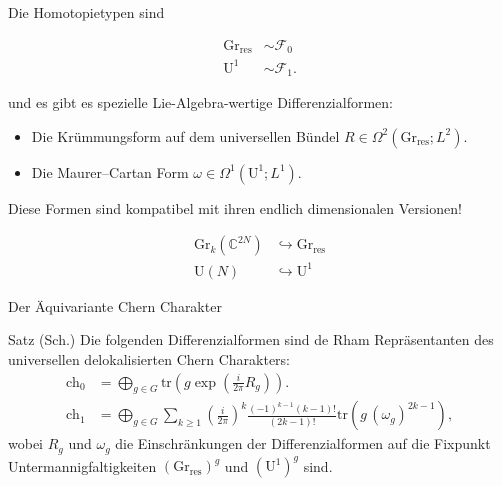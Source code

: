 \documentclass[12pt,utf8,notheorems,compress,t]{beamer}
\renewcommand{\_}{\mathpunct{.}}
\newcommand{\?}{\,{:}\,}
\newcommand{\CC}{\mathbb{C}}
\newcommand{\tr}{\mathrm{tr}}
\newcommand{\ch}{\mathrm{ch}}
\newcommand{\grres}{\mathrm{Gr}_{\mathrm{res}}}
\begin{document}
\begin{frame}
    Die Homotopietypen sind 
    \begin{exampleblock}{}
        \vspace{-1em}
        \begin{align*}
            \mathrm{Gr}_{\mathrm{res}} &\sim \mathscr{F}_0 \\
            \mathrm U^1 &\sim \mathscr{F}_1.
        \end{align*}
    \end{exampleblock}
    und es gibt es spezielle Lie-Algebra-wertige
    Differenzialformen:
    \begin{itemize}
        \item Die Krümmungsform auf dem universellen Bündel $R\in
            \Omega^2(\mathrm{Gr}_{\mathrm{res}}; L^2)$.
        \item Die Maurer--Cartan Form $\omega\in \Omega^1(\mathrm U^1;
            L^1)$.
    \end{itemize}
    Diese Formen sind kompatibel mit ihren endlich dimensionalen Versionen!
    \begin{exampleblock}{}
        \vspace{-1em}
        \begin{align*}
            \mathrm{Gr}_{k}(\CC^{2N}) &\hookrightarrow \grres \\
            \mathrm{U}(N) &\hookrightarrow \mathrm U^1
        \end{align*}
    \end{exampleblock}
\end{frame}
\begin{frame}{Der Äquivariante Chern Charakter}
    \begin{block}{Satz (Sch.)}
        Die folgenden Differenzialformen sind de Rham Repräsentanten des
        universellen delokalisierten Chern Charakters:
        \begin{align*}
            \ch_{\mathrm{0}} &= \bigoplus_{g\in G} \tr \left( g \exp\left(
            \frac{i}{2\pi}R_g \right) \right). \\
            \ch_{\mathrm{1}} &= \bigoplus_{g\in G} \sum_{k\geq 1}
            \left(\frac{i}{2\pi}\right)^{k}
            \frac{(-1)^{k-1}(k-1)!}{(2k-1)!}\tr \left(g\,
            (\omega_g)^{2k-1}\right),
        \end{align*}
        wobei $R_g$ und $\omega_g$ die Einschränkungen der Differenzialformen
        auf die Fixpunkt Untermannigfaltigkeiten $(\grres)^g$ und $(\mathrm
        U^1)^g$ sind.
    \end{block}
\end{frame}
\end{document}
